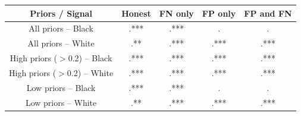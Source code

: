 \begin{table}[H]\centering \begin{tabular}{ccccc} \hline \hline
\textbf{Priors / Signal}&\textbf{Honest}&\textbf{FN only}&\textbf{FP only}&\textbf{FP and FN}\\ \hline
All priors -- Black&.***&.***&.&.\\
All priors -- White&.**&.***&.***&.***\\
High priors ($>$0.2) -- Black&.***&.***&.***&.***\\
High priors ($>$0.2) -- White&.***&.***&.***&.***\\
Low priors -- Black&.***&.***&.&.\\
Low priors -- White&.**&.***&.***&.***\\
\hline \end{tabular} \end{table}
